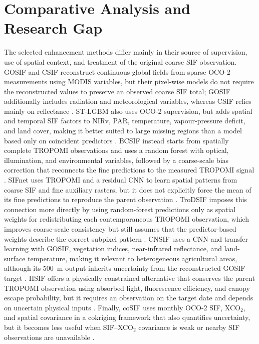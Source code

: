 \section{Comparative Analysis and Research Gap}
\label{sec:comparative_analysis_research_gap}

The selected enhancement methods differ mainly in their source of supervision, use of spatial context, and treatment of the original coarse SIF observation. GOSIF and CSIF reconstruct continuous global fields from sparse OCO-2 measurements using MODIS variables, but their pixel-wise models do not require the reconstructed values to preserve an observed coarse SIF total; GOSIF additionally includes radiation and meteorological variables, whereas CSIF relies mainly on reflectance \cite{li2019global,zhang2018global}. ST-LGBM also uses OCO-2 supervision, but adds spatial and temporal SIF factors to NIRv, PAR, temperature, vapour-pressure deficit, and land cover, making it better suited to large missing regions than a model based only on coincident predictors \cite{shen2022spatiotemporal}. BCSIF instead starts from spatially complete TROPOMI observations and uses a random forest with optical, illumination, and environmental variables, followed by a coarse-scale bias correction that reconnects the fine predictions to the measured TROPOMI signal \cite{hu2024spatially}. SIFnet uses TROPOMI and a residual CNN to learn spatial patterns from coarse SIF and fine auxiliary rasters, but it does not explicitly force the mean of its fine predictions to reproduce the parent observation \cite{gensheimer2022convolutional}. TroDSIF imposes this connection more directly by using random-forest predictions only as spatial weights for redistributing each contemporaneous TROPOMI observation, which improves coarse-scale consistency but still assumes that the predictor-based weights describe the correct subpixel pattern \cite{chen2025improved}. CNSIF uses a CNN and transfer learning with GOSIF, vegetation indices, near-infrared reflectance, and land-surface temperature, making it relevant to heterogeneous agricultural areas, although its 500~m output inherits uncertainty from the reconstructed GOSIF target \cite{du2025cnsif}. HSIF offers a physically constrained alternative that conserves the parent TROPOMI observation using absorbed light, fluorescence efficiency, and canopy escape probability, but it requires an observation on the target date and depends on uncertain physical inputs \cite{zhang2023generating}. Finally, coSIF uses monthly OCO-2 SIF, XCO$_2$, and spatial covariance in a cokriging framework that also quantifies uncertainty, but it becomes less useful when SIF--XCO$_2$ covariance is weak or nearby SIF observations are unavailable \cite{jacobson2023spatial}.

